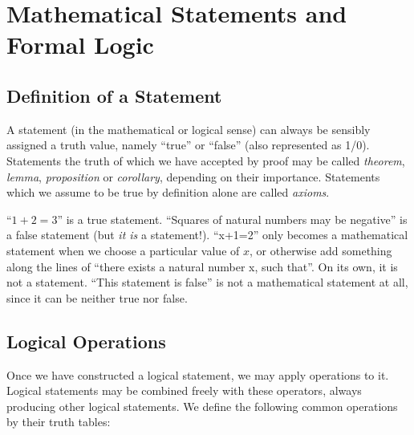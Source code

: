 \chapter{Mathematical Statements and Formal Logic}\label{ch:statements}
\section{Definition of a Statement}

\begin{definition}
  A statement (in the mathematical or logical sense) can always be sensibly
  assigned a truth value, namely ``true'' or ``false'' (also represented as 1/0).
  Statements the truth of which we have accepted by proof may be called
  \emph{theorem}, \emph{lemma}, \emph{proposition} or \emph{corollary},
  depending on their importance.
  Statements which we assume to be true by definition alone are called
  \emph{axioms}.
\end{definition}

\begin{example}
  \begin{itemize}
    \leavevmode
    \ii{} ``\(1+2=3\)'' is a true statement.
    \ii{} ``Squares of natural numbers may be negative'' is a false statement
          (but \emph{it is} a statement!).
    \ii{} ``x+1=2'' only becomes a mathematical statement when we choose a
          particular value of \(x\), or otherwise add something along the lines
          of ``there exists a natural number x, such that''. On its own, it is
          not a statement.
   \ii{} ``This statement is false'' is not a mathematical statement at all,
          since it can be neither true nor false.
  \end{itemize}
\end{example}

\section{Logical Operations}
Once we have constructed a logical statement, we may apply operations to it.
Logical statements may be combined freely with these operators, always producing
other logical statements. We define the following common operations by their
truth tables:

